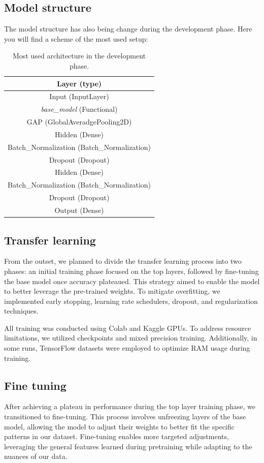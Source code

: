 \documentclass[11pt]{article}
\begin{document}
\subsection{Model structure}
The model structure has also being change during the development phase.
Here you will find a scheme of the most used setup:
\begin{table}[h!]
\centering
\begin{tabular}{|c|}
\hline
\textbf{Layer (type)} \\ \hline
Input (InputLayer)\\ \hline
\textit{base\_model} (Functional)\\ \hline
GAP (GlobalAveradgePooling2D)\\ \hline
Hidden (Dense)\\ \hline
Batch\_Normalization (Batch\_Normalization)\\ \hline
Dropout (Dropout)\\ \hline
Hidden (Dense)\\ \hline
Batch\_Normalization (Batch\_Normalization)\\ \hline
Dropout (Dropout)\\ \hline
Output (Dense)\\ \hline
\end{tabular}

\caption{Most used architecture in the development phase.}
\end{table}
\subsection{Transfer learning}
From the outset, we planned to divide the transfer learning process into two phases: an initial training phase focused on the top layers, followed by fine-tuning the base model once accuracy plateaued. This strategy aimed to enable the model to better leverage the pre-trained weights. To mitigate overfitting, we implemented early stopping, learning rate schedulers, dropout, and regularization techniques.

All training was conducted using Colab and Kaggle GPUs. To address resource limitations, we utilized checkpoints and mixed precision training. Additionally, in some runs, TensorFlow datasets were employed to optimize RAM usage during training.
\subsection{Fine tuning}
After achieving a plateau in performance during the top layer training phase, we transitioned to fine-tuning. This process involves unfreezing layers of the base model, allowing the model to adjust their weights to better fit the specific patterns in our dataset. Fine-tuning enables more targeted adjustments, leveraging the general features learned during pretraining while adapting to the nuances of our data.
\end{document}
